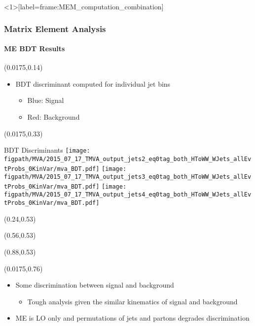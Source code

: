 \begin{frame}<1>[label=frame:MEM_computation_combination]
	\frametitle{Matrix Element Analysis}
	\framesubtitle{ME BDT Results}
	\vspace*{-0.24cm}
	\begin{textblock}{0.96}(0.0175,0.14)
		\begin{block}{}
			\begin{itemize}
				\item BDT discriminant computed for individual jet bins
				\begin{itemize}
					\item {\color{blue}Blue: Signal}
					\item {\color{red}Red: Background}
				\end{itemize}
			\end{itemize}
		\end{block}
	\end{textblock}
	\begin{textblock}{0.96}(0.0175,0.33)
		\begin{alertblock}{BDT Discriminants}
			\centering
			\texttt{[image: \\figpath/MVA/2015\_07\_17\_TMVA\_output\_jets2\_eq0tag\_both\_HToWW\_WJets\_allEvtProbs\_0KinVar/mva\_BDT.pdf]}%
			\texttt{[image: \\figpath/MVA/2015\_07\_17\_TMVA\_output\_jets3\_eq0tag\_both\_HToWW\_WJets\_allEvtProbs\_0KinVar/mva\_BDT.pdf]}%
			\texttt{[image: \\figpath/MVA/2015\_07\_17\_TMVA\_output\_jets4\_eq0tag\_both\_HToWW\_WJets\_allEvtProbs\_0KinVar/mva\_BDT.pdf]}%
		\end{alertblock}
	\end{textblock}
	\begin{textblock}{0.15}(0.24,0.53){\color{red}{2 Jets}}\end{textblock}
	\begin{textblock}{0.15}(0.56,0.53){\color{red}{3 Jets}}\end{textblock}
	\begin{textblock}{0.15}(0.88,0.53){\color{red}{$\geq$4 Jets}}\end{textblock}
	\begin{textblock}{0.96}(0.0175,0.76)
		\begin{block}{}
			\begin{itemize}
				\item Some discrimination between signal and background
				\begin{itemize}
					\item Tough analysis given the similar kinematics of signal and background
				\end{itemize}
				\item ME is LO only and permutations of jets and partons degrades discrimination
			\end{itemize}
		\end{block}
	\end{textblock}
\end{frame}